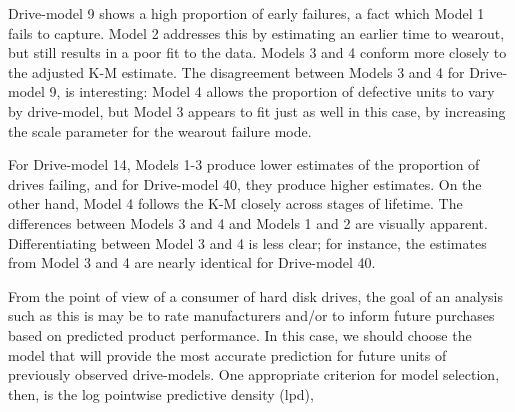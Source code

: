 \documentclass[12pt]{article}
\begin{document}
Drive-model 9 shows a high proportion of early failures, a fact which Model 1 fails to capture. Model 2 addresses this by estimating an earlier time to wearout, but still results in a poor fit to the data. Models 3 and 4 conform more closely to the adjusted K-M estimate. The disagreement between Models 3 and 4 for Drive-model 9, is interesting: Model 4 allows the proportion of defective units to vary by drive-model, but Model 3 appears to fit just as well in this case, by increasing the scale parameter for the wearout failure mode.

For Drive-model 14, Models 1-3 produce lower estimates of the proportion of drives failing, and for Drive-model 40, they produce higher estimates.  On the other hand, Model 4 follows the K-M closely across stages of lifetime.  The differences between Models 3 and 4 and Models 1 and 2 are visually apparent.  Differentiating between Model 3 and 4 is less clear; for instance, the estimates from Model 3 and 4 are nearly identical for Drive-model 40.



From the point of view of a consumer of hard disk drives, the goal of an analysis such as this is may be to rate manufacturers and/or to inform future purchases based on predicted product performance. In this case, we should choose the model that will provide the most accurate prediction for future units of previously observed drive-models. One appropriate criterion for model selection, then, is the log pointwise predictive density (lpd),
\end{document}
